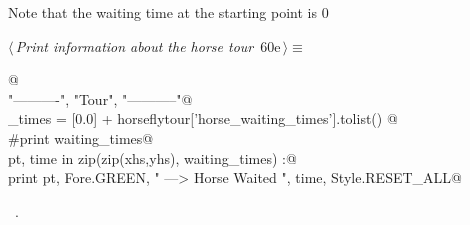 \documentclass[11.5pt]{report}
\begin{document}
\vspace{-0.8cm} \newchunk  Note that the waiting time at the starting point is 0
\begin{flushleft} \small\label{scrap86}\raggedright\small
{} $\langle\,${\itshape Print information about the horse tour}\nobreak\ {\footnotesize {60e}}$\,\rangle\equiv$
\vspace{-1ex}
\begin{list}{}{} \item
\mbox{}\verb@   @\\
\mbox{}\verb@print "\n----------", "\nHorse Tour", "\n-----------"@\\
\mbox{}\verb@waiting_times = [0.0] + horseflytour['horse_waiting_times'].tolist() @\\
\mbox{}\verb@#print waiting_times@\\
\mbox{}\verb@for pt, time in zip(zip(xhs,yhs), waiting_times) :@\\
\mbox{}\verb@   print pt, Fore.GREEN, " ---> Horse Waited ", time, Style.RESET_ALL@\\
\mbox{}\verb@@{\NWsep}
\end{list}
\vspace{-1.5ex}
\footnotesize
\begin{list}{}{\setlength{\itemsep}{-\parsep}\setlength{\itemindent}{-\leftmargin}}
\item \NWtxtMacroRefIn\ .

\item{}
\end{list}
\vspace{4ex}
\end{flushleft}
\end{document}
